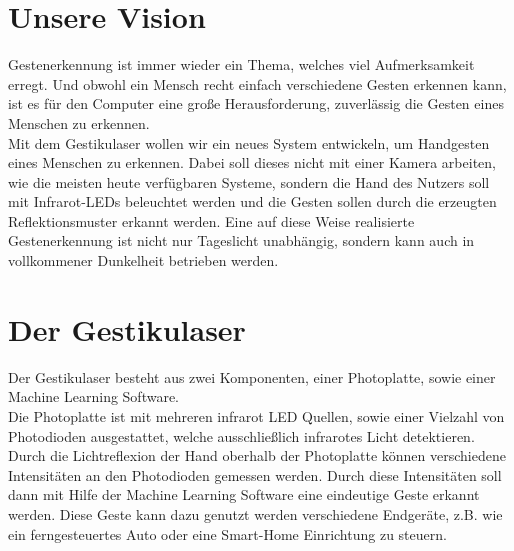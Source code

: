 \documentclass{sciposter}
\begin{document}
\begin{multicols}{3}
\setlength{\parindent}{2em}

\section{Unsere Vision}
Gestenerkennung ist immer wieder ein Thema, welches viel Aufmerksamkeit erregt. Und obwohl ein Mensch recht einfach verschiedene Gesten erkennen kann, ist es für den Computer eine große Herausforderung, zuverlässig die Gesten eines Menschen zu erkennen. \\
Mit dem Gestikulaser wollen wir ein neues System entwickeln, um Handgesten eines Menschen zu erkennen. Dabei soll dieses nicht mit einer Kamera arbeiten, wie die meisten heute verfügbaren Systeme, sondern die Hand des Nutzers soll mit Infrarot-LEDs beleuchtet werden und die Gesten sollen durch die erzeugten Reflektionsmuster erkannt werden. Eine auf diese Weise realisierte Gestenerkennung ist nicht nur Tageslicht unabhängig, sondern kann auch in vollkommener Dunkelheit betrieben werden. \\

\section{Der Gestikulaser}
Der Gestikulaser besteht aus zwei Komponenten, einer Photoplatte, sowie einer Machine Learning Software. \\
Die Photoplatte ist mit mehreren infrarot LED Quellen, sowie einer Vielzahl von Photodioden ausgestattet, welche ausschließlich infrarotes Licht detektieren. Durch die Lichtreflexion der Hand oberhalb der Photoplatte können verschiedene Intensitäten an den Photodioden gemessen werden. Durch diese Intensitäten soll dann mit Hilfe der Machine Learning Software eine eindeutige Geste erkannt werden. Diese Geste kann dazu genutzt werden verschiedene Endgeräte, z.B. wie ein ferngesteuertes Auto oder eine Smart-Home Einrichtung zu steuern. \\


\end{multicols}
\end{document}
